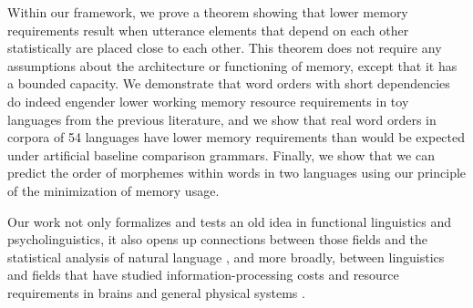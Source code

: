 Within our framework, we prove a theorem showing that lower memory requirements result when utterance elements that depend on each other statistically are placed close to each other. This theorem does not require any assumptions about the architecture or functioning of memory, except that it has a bounded capacity. We demonstrate that word orders with short dependencies do indeed engender lower working memory resource requirements in toy languages from the previous literature, and we show that real word orders in corpora of 54 languages have lower memory requirements than would be expected under artificial baseline comparison grammars. Finally, we show that we can predict the order of morphemes within words in two languages using our principle of the minimization of memory usage.

Our work not only formalizes and tests an old idea in functional linguistics and psycholinguistics, it also opens up connections between those fields and the statistical analysis of natural language \citep{debowski-excess-2011,bentz2017word,lin-critical-2017}, and more broadly, between linguistics and fields that have studied information-processing costs and resource requirements in brains \citep{friston2010free} and general physical systems \citep{still2012thermodynamic}. 





